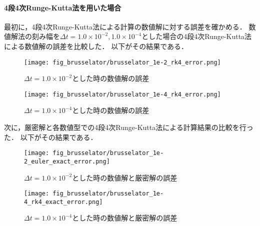 \paragraph*{4段4次Runge-Kutta法を用いた場合}
最初に，4段4次Runge-Kutta法による計算の数値解に対する誤差を確かめる．
数値解法の刻み幅を$\Delta t = 1.0 \times 10^{-2},1.0 \times 10^{-4}$とした場合の4段4次Runge-Kutta法による数値解の誤差を比較した．
以下がその結果である．
\begin{figure}[H]
    \centering
    \begin{minipage}[b]{0.49\columnwidth}
        \centering
        \texttt{[image: fig\_brusselator/brusselator\_1e-2\_rk4\_error.png]}
        \caption{$\Delta t = 1.0 \times 10^{-2}$とした時の数値解の誤差}
        \label{fig:brusselator_1e-2_rk4_error}
    \end{minipage}
    \begin{minipage}[b]{0.49\columnwidth}
        \centering
        \texttt{[image: fig\_brusselator/brusselator\_1e-4\_rk4\_error.png]}
        \caption{$\Delta t = 1.0 \times 10^{-4}$とした時の数値解の誤差}
        \label{fig:brusselator_1e-4_rk4_error}
    \end{minipage}
\end{figure}

次に，厳密解と各数値型での4段4次Runge-Kutta法による計算結果の比較を行った．
以下がその結果である．\\
\begin{figure}[H]
    \centering
    \begin{minipage}[b]{0.49\columnwidth}
        \centering
        \texttt{[image: fig\_brusselator/brusselator\_1e-2\_euler\_exact\_error.png]}
        \caption{$\Delta t = 1.0 \times 10^{-2}$とした時の数値解と厳密解の誤差}
        \label{fig:brusselator_1e-2_rk4_exact_error}
    \end{minipage}
    \begin{minipage}[b]{0.49\columnwidth}
        \centering
        \texttt{[image: fig\_brusselator/brusselator\_1e-4\_rk4\_exact\_error.png]}
        \caption{$\Delta t = 1.0 \times 10^{-4}$とした時の数値解と厳密解の誤差}
        \label{fig:brusselator_1e-4_exact_error}
    \end{minipage}
\end{figure}

